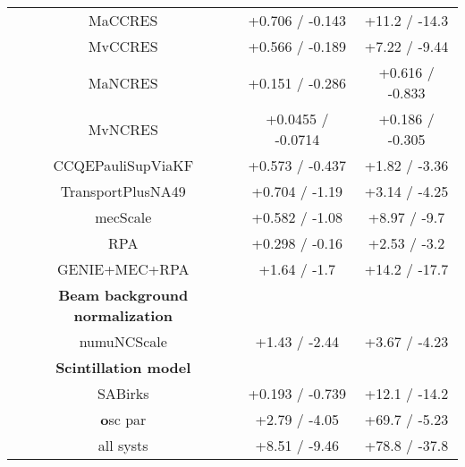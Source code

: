 \begin{table*}[t]
\begin{tabular}{c c c}
    MaCCRES & +0.706 / -0.143 & +11.2 / -14.3\\
    MvCCRES & +0.566 / -0.189 & +7.22 / -9.44\\
    MaNCRES & +0.151 / -0.286 & +0.616 / -0.833\\
    MvNCRES & +0.0455 / -0.0714 & +0.186 / -0.305\\
    CCQEPauliSupViaKF & +0.573 / -0.437 & +1.82 / -3.36\\
    TransportPlusNA49 & +0.704 / -1.19 & +3.14 / -4.25\\
    mecScale & +0.582 / -1.08 & +8.97 / -9.7\\
    RPA & +0.298 / -0.16 & +2.53 / -3.2\\
    GENIE+MEC+RPA & +1.64 / -1.7 & +14.2 / -17.7\\
    \textbf{Beam background normalization} & & \\
    numuNCScale & +1.43 / -2.44 & +3.67 / -4.23\\
    \textbf{Scintillation model} & & \\
    SABirks & +0.193 / -0.739 & +12.1 / -14.2\\
    \textbf
    osc par & +2.79 / -4.05 & +69.7 / -5.23\\
    \hline
    all systs & +8.51 / -9.46 & +78.8 / -37.8\\
    \hline
  \end{tabular}
  \label{tab:systShifts}
\end{table*}




